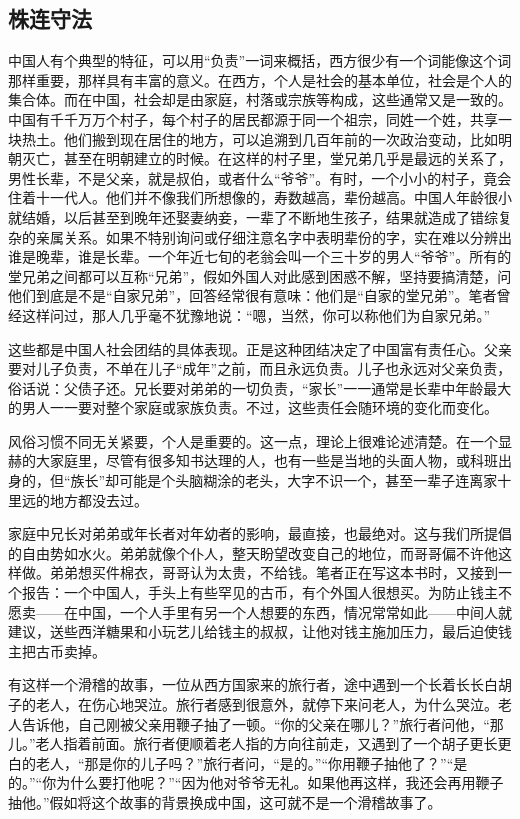 \documentclass[12pt,oneside]{book}
\begin{document}
\begin{common-format}
\chapter{株连守法}
中国人有个典型的特征，可以用“负责”一词来概括，西方很少有一个词能像这个词那样重要，那样具有丰富的意义。在西方，个人是社会的基本单位，社会是个人的集合体。而在中国，社会却是由家庭，村落或宗族等构成，这些通常又是一致的。中国有千千万万个村子，每个村子的居民都源于同一个祖宗，同姓一个姓，共享一块热土。他们搬到现在居住的地方，可以追溯到几百年前的一次政治变动，比如明朝灭亡，甚至在明朝建立的时候。在这样的村子里，堂兄弟几乎是最远的关系了，男性长辈，不是父亲，就是叔伯，或者什么“爷爷”。有时，一个小小的村子，竟会住着十一代人。他们并不像我们所想像的，寿数越高，辈份越高。中国人年龄很小就结婚，以后甚至到晚年还娶妻纳妾，一辈了不断地生孩子，结果就造成了错综复杂的亲属关系。如果不特别询问或仔细注意名字中表明辈份的字，实在难以分辨出谁是晚辈，谁是长辈。一个年近七旬的老翁会叫一个三十岁的男人“爷爷”。所有的堂兄弟之间都可以互称“兄弟”，假如外国人对此感到困惑不解，坚持要搞清楚，问他们到底是不是“自家兄弟”，回答经常很有意味：他们是“自家的堂兄弟”。笔者曾经这样问过，那人几乎毫不犹豫地说：“嗯，当然，你可以称他们为自家兄弟。” 

这些都是中国人社会团结的具体表现。正是这种团结决定了中国富有责任心。父亲要对儿子负责，不单在儿子“成年”之前，而且永远负责。儿子也永远对父亲负责，俗话说：父债子还。兄长要对弟弟的一切负责，“家长”一一通常是长辈中年龄最大的男人一一要对整个家庭或家族负责。不过，这些责任会随环境的变化而变化。 

风俗习惯不同无关紧要，个人是重要的。这一点，理论上很难论述清楚。在一个显赫的大家庭里，尽管有很多知书达理的人，也有一些是当地的头面人物，或科班出身的，但“族长”却可能是个头脑糊涂的老头，大字不识一个，甚至一辈子连离家十里远的地方都没去过。 

家庭中兄长对弟弟或年长者对年幼者的影响，最直接，也最绝对。这与我们所提倡的自由势如水火。弟弟就像个仆人，整天盼望改变自己的地位，而哥哥偏不许他这样做。弟弟想买件棉衣，哥哥认为太贵，不给钱。笔者正在写这本书时，又接到一个报告：一个中国人，手头上有些罕见的古币，有个外国人很想买。为防止钱主不愿卖——在中国，一个人手里有另一个人想要的东西，情况常常如此——中间人就建议，送些西洋糖果和小玩艺儿给钱主的叔叔，让他对钱主施加压力，最后迫使钱主把古币卖掉。 

有这样一个滑稽的故事，一位从西方国家来的旅行者，途中遇到一个长着长长白胡子的老人，在伤心地哭泣。旅行者感到很意外，就停下来问老人，为什么哭泣。老人告诉他，自己刚被父亲用鞭子抽了一顿。“你的父亲在哪儿？”旅行者问他，“那儿。”老人指着前面。旅行者便顺着老人指的方向往前走，又遇到了一个胡子更长更白的老人，“那是你的儿子吗？”旅行者问，“是的。”“你用鞭子抽他了？”“是的。”“你为什么要打他呢？”“因为他对爷爷无礼。如果他再这样，我还会再用鞭子抽他。”假如将这个故事的背景换成中国，这可就不是一个滑稽故事了。 


\end{common-format}
\end{document}
